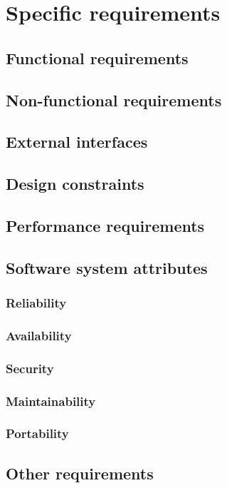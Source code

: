 \chapter{Specific requirements}
	\section{Functional requirements}
	\section{Non-functional requirements}
	\section{External interfaces}
	\section{Design constraints}
	\section{Performance requirements}
	\section{Software system attributes}
		\subsection{Reliability}
		\subsection{Availability}
		\subsection{Security}
		\subsection{Maintainability}
		\subsection{Portability}
	\section{Other requirements}